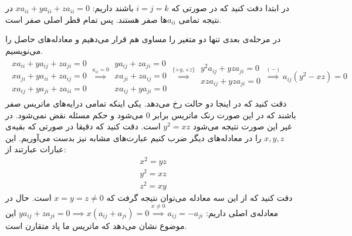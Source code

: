 \\
\\
در ابتدا دقت کنید که در صورتی که
$i=j=k$
باشند داریم:
$xa_{ii} + ya_{ii} + za_{ii} = 0$
در نتیجه تمامی
$a_{ii}$ها
صفر هستند. پس تمام قطر اصلی صفر است.

\noindent
در مرحله‌ی بعدی تنها دو متغیر را مساوی هم قرار می‌دهیم و معادله‌های حاصل را می‌نویسیم.
\begin{gather*}
    \begin{array}{c}
        xa_{ii} + ya_{ij} + za_{ji} = 0\\
        xa_{ji} + ya_{ii} + za_{ij} = 0\\
        xa_{ij} + ya_{ji} + za_{ii} = 0
    \end{array}
    \stackrel{a_{ii} = 0}{\implies}
    \begin{array}{c}
        ya_{ij} + za_{ji} = 0\\
        xa_{ji} + za_{ij} = 0\\
        xa_{ij} + ya_{ji} = 0
    \end{array}
    \stackrel{\{\times y, \times z\}}{\implies} 
    \begin{array}{c}
        y^2a_{ij} + yza_{ji} = 0\\
        xza_{ij} + yza_{ji} = 0\\
    \end{array}
    \stackrel{(-)}{\implies}
    a_{ij} (y^2 - xz) = 0
\end{gather*}
دقت کنید که در اینجا دو حالت رخ می‌دهد. یکی اینکه تمامی درایه‌های ماتریس صفر باشند که در این صورت رنک
ماتریس برابر 0 می‌شود و حکم مسئله نقض نمی‌شود.
در غیر این صورت نتیجه می‌شود
$y^2 = xz$
است. دقت کنید که دقیقا در صورتی که بقیه‌ی
$x, y, z$
را در معادله‌های دیگر ضرب کنیم عبارت‌های مشابه نیز بدست می‌آوریم.
این عبارات عبارتند از:
\begin{gather*}
    x^2 = yz\\
    y^2 = xz\\
    z^2 = xy
\end{gather*}
دقت کنید که از این سه معادله می‌توان نتیجه گرفت که
$x = y = z \neq 0$
است. حال در معادله‌ی اصلی داریم:
$ya_{ij} + za_{ji} = 0 \implies x(a_{ij} + a_{ji}) = 0 \stackrel{x \neq 0}{\implies} a_{ij} = -a_{ji}$
این موضوع نشان می‌دهد که ماتریس ما پاد متقارن است.

